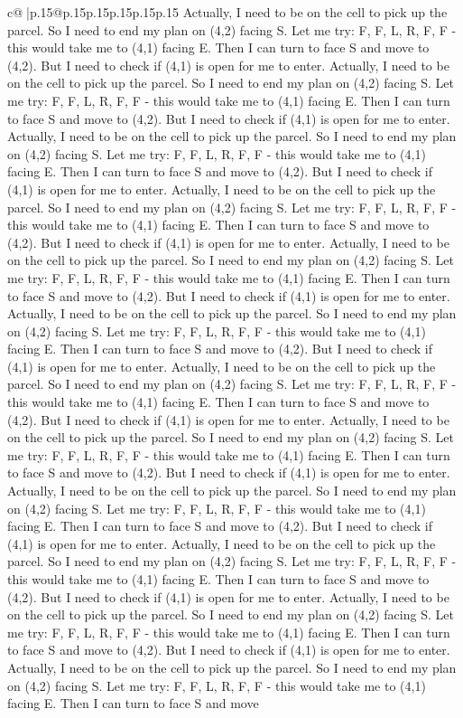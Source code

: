 \documentclass{article}
\begin{document}
{\begin{supertabular}{c@{$\;$}|p{.15\linewidth}@{}p{.15\linewidth}p{.15\linewidth}p{.15\linewidth}p{.15\linewidth}p{.15\linewidth}}
{{{Actually, I need to be on the cell to pick up the parcel. So I need to end my plan on (4,2) facing S. Let me try: F, F, L, R, F, F {-} this would take me to (4,1) facing E. Then I can turn to face S and move to (4,2). But I need to check if (4,1) is open for me to enter. Actually, I need to be on the cell to pick up the parcel. So I need to end my plan on (4,2) facing S. Let me try: F, F, L, R, F, F {-} this would take me to (4,1) facing E. Then I can turn to face S and move to (4,2). But I need to check if (4,1) is open for me to enter. Actually, I need to be on the cell to pick up the parcel. So I need to end my plan on (4,2) facing S. Let me try: F, F, L, R, F, F {-} this would take me to (4,1) facing E. Then I can turn to face S and move to (4,2). But I need to check if (4,1) is open for me to enter. Actually, I need to be on the cell to pick up the parcel. So I need to end my plan on (4,2) facing S. Let me try: F, F, L, R, F, F {-} this would take me to (4,1) facing E. Then I can turn to face S and move to (4,2). But I need to check if (4,1) is open for me to enter. Actually, I need to be on the cell to pick up the parcel. So I need to end my plan on (4,2) facing S. Let me try: F, F, L, R, F, F {-} this would take me to (4,1) facing E. Then I can turn to face S and move to (4,2). But I need to check if (4,1) is open for me to enter. Actually, I need to be on the cell to pick up the parcel. So I need to end my plan on (4,2) facing S. Let me try: F, F, L, R, F, F {-} this would take me to (4,1) facing E. Then I can turn to face S and move to (4,2). But I need to check if (4,1) is open for me to enter. Actually, I need to be on the cell to pick up the parcel. So I need to end my plan on (4,2) facing S. Let me try: F, F, L, R, F, F {-} this would take me to (4,1) facing E. Then I can turn to face S and move to (4,2). But I need to check if (4,1) is open for me to enter. Actually, I need to be on the cell to pick up the parcel. So I need to end my plan on (4,2) facing S. Let me try: F, F, L, R, F, F {-} this would take me to (4,1) facing E. Then I can turn to face S and move to (4,2). But I need to check if (4,1) is open for me to enter. Actually, I need to be on the cell to pick up the parcel. So I need to end my plan on (4,2) facing S. Let me try: F, F, L, R, F, F {-} this would take me to (4,1) facing E. Then I can turn to face S and move to (4,2). But I need to check if (4,1) is open for me to enter. Actually, I need to be on the cell to pick up the parcel. So I need to end my plan on (4,2) facing S. Let me try: F, F, L, R, F, F {-} this would take me to (4,1) facing E. Then I can turn to face S and move to (4,2). But I need to check if (4,1) is open for me to enter. Actually, I need to be on the cell to pick up the parcel. So I need to end my plan on (4,2) facing S. Let me try: F, F, L, R, F, F {-} this would take me to (4,1) facing E. Then I can turn to face S and move to (4,2). But I need to check if (4,1) is open for me to enter. Actually, I need to be on the cell to pick up the parcel. So I need to end my plan on (4,2) facing S. Let me try: F, F, L, R, F, F {-} this would take me to (4,1) facing E. Then I can turn to face S and move }}}
\end{supertabular}}
\end{document}
